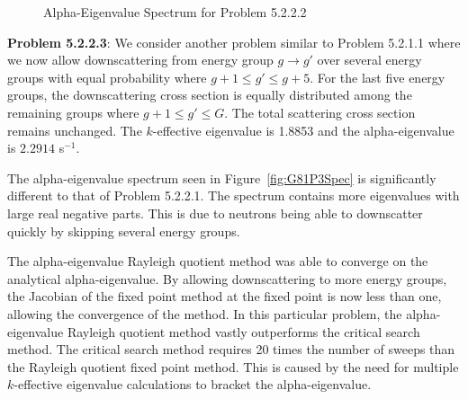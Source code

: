 \begin{figure}
\centering
	\resizebox{0.75\textwidth}{!}{
	}
\caption{Alpha-Eigenvalue Spectrum for Problem 5.2.2.2}
\label{fig:G81VSpec}
\end{figure}

\begin{table}[H]
    \centering
    \caption{Transport Sweeps for Convergence for Problem 5.2.2.2}
\label{table:G81b}
\end{table}

\textbf{Problem 5.2.2.3}: We consider another problem similar to Problem 5.2.1.1 where we now allow downscattering from energy group $g \rightarrow g'$ over several energy groups with equal probability where $g + 1 \leq g' \leq g+5$. For the last five energy groups, the downscattering cross section is equally distributed among the remaining groups where $g+1 \leq g' \leq G$. The total scattering cross section remains unchanged. The $k$-effective eigenvalue is 1.8853 and the alpha-eigenvalue is $2.2914$ s$^{-1}$.

The alpha-eigenvalue spectrum seen in Figure~\ref{fig:G81P3Spec} is significantly different to that of Problem 5.2.2.1. The spectrum contains more eigenvalues with large real negative parts. This is due to neutrons being able to downscatter quickly by skipping several energy groups.

The alpha-eigenvalue Rayleigh quotient method was able to converge on the analytical alpha-eigenvalue. By allowing downscattering to more energy groups, the Jacobian of the fixed point method at the fixed point is now less than one, allowing the convergence of the method. In this particular problem, the alpha-eigenvalue Rayleigh quotient method vastly outperforms the critical search method. The critical search method requires 20 times the number of sweeps than the Rayleigh quotient fixed point method. This is caused by the need for multiple $k$-effective eigenvalue calculations to bracket the alpha-eigenvalue.

